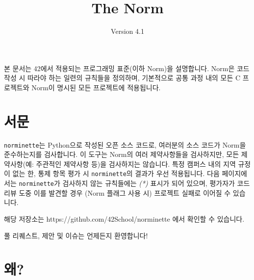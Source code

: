 \documentclass{42-ko}
\begin{document}
\title{The Norm}
\subtitle{Version 4.1}

\summary
{
    본 문서는 42에서 적용되는 프로그래밍 표준(이하 Norm)을 설명합니다.
    Norm은 코드 작성 시 따라야 하는 일련의 규칙들을 정의하며, 기본적으로
    공통 과정 내의 모든 C 프로젝트와 Norm이 명시된 모든 프로젝트에 적용됩니다.
}

\maketitle

\tableofcontents



\chapter{서문}

\texttt{norminette}는 Python으로 작성된 오픈 소스 코드로, 여러분의 소스 코드가
Norm을 준수하는지를 검사합니다. 이 도구는 Norm의 여러 제약사항들을 검사하지만,
모든 제약사항(예: 주관적인 제약사항 등)을 검사하지는 않습니다. 특정 캠퍼스 내의
지역 규정이 없는 한, 통제 항목 평가 시 \texttt{norminette}의 결과가 우선 적용됩니다.
다음 페이지에서는 \texttt{norminette}가 검사하지 않는 규칙들에는 \textit{(*)} 표시가 되어 있으며,
평가자가 코드 리뷰 도중 이를 발견할 경우 (Norm 플래그 사용 시) 프로젝트 실패로
이어질 수 있습니다.


해당 저장소는 https://github.com/42School/norminette 에서 확인할 수 있습니다.


풀 리퀘스트, 제안 및 이슈는 언제든지 환영합니다!

\newpage


%
%
    \chapter{왜?}
\end{document}
